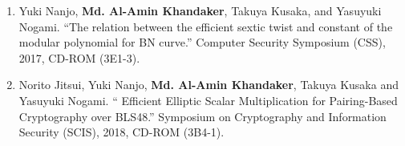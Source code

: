 \begin{itemize}
\begin{enumerate}
	\item Yuki Nanjo,  \textbf{Md. Al-Amin Khandaker}, Takuya Kusaka, and  Yasuyuki Nogami. ``The relation between the efficient sextic twist and constant of the modular polynomial for BN curve.'' Computer Security Symposium  (CSS),  2017, CD-ROM (3E1-3). 
	
	\item  Norito Jitsui, Yuki Nanjo, \textbf{Md. Al-Amin Khandaker}, Takuya Kusaka and Yasuyuki Nogami. ``	Efficient Elliptic Scalar Multiplication for Pairing-Based Cryptography over BLS48.'' Symposium on Cryptography and Information Security (SCIS),  2018, CD-ROM (3B4-1).
\end{enumerate}
\normalsize
\end{itemize}


